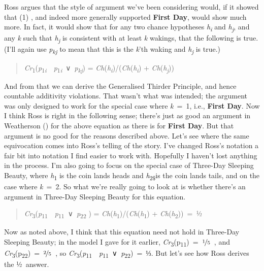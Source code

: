 \documentclass[
  10pt,
  letterpaper,
  DIV=11,
  numbers=noendperiod,
  twoside]{scrartcl}
\begin{document}
Ross argues that the style of argument we've been considering would, if
it showed that (1) , and indeed more generally supported \textbf{First
Day}, would show much more. In fact, it would show that for any two
chance hypotheses \emph{h\textsubscript{i}} and
\emph{h\textsubscript{j}}, and any \emph{k} such that
\emph{h\textsubscript{j}} is consistent with at least \emph{k} wakings,
that the following is true. (I'll again use \emph{p\textsubscript{kj}}
to mean that this is the \emph{k}'th waking and
\emph{h\textsubscript{j}} is true.)

\begin{quote}
\emph{Cr}\textsubscript{1}(\emph{p}\textsubscript{1\emph{i}}~\textbar~\emph{p}\textsubscript{1\emph{i}}~∨~\emph{p\textsubscript{kj}})
=
\emph{Ch}(\emph{h\textsubscript{i}})/(\emph{Ch}(\emph{h\textsubscript{i}})
+ \emph{Ch}(\emph{h\textsubscript{j}}))
\end{quote}

And from that we can derive the Generalised Thirder Principle, and hence
countable additivity violations. That wasn't what was intended; the
argument was only designed to work for the special case where
\emph{k}~=~1, i.e., \textbf{First Day}. Now I think Ross is right in the
following sense; there's just as good an argument in Weatherson
() for the above equation as there
is for \textbf{First Day}. But that argument is no good for the reasons
described above. Let's see where the same equivocation comes into Ross's
telling of the story. I've changed Ross's notation a fair bit into
notation I find easier to work with. Hopefully I haven't lost anything
in the process. I'm also going to focus on the special case of Three-Day
Sleeping Beauty, where \emph{h}\textsubscript{1} is the coin lands heads
and \emph{h}\textsubscript{2\$}is the coin lands tails, and on the case
where \emph{k}~=~2. So what we're really going to look at is whether
there's an argument in Three-Day Sleeping Beauty for this equation.

\begin{quote}
\emph{Cr}\textsubscript{3}(\emph{p}\textsubscript{11}~\textbar~\emph{p}\textsubscript{11}~∨~\emph{p}\textsubscript{22}
) =
\emph{Ch}(\emph{h}\textsubscript{1})/(\emph{Ch}(\emph{h}\textsubscript{1})
+ \emph{Ch}(\emph{h}\textsubscript{2}))~=~½
\end{quote}

Now as noted above, I think that this equation need not hold in
Three-Day Sleeping Beauty; in the model I gave for it earlier,
\emph{Cr}\textsubscript{3}(p\textsubscript{11})~=~\(\nicefrac{1}{5}\)~,
and
\emph{Cr}\textsubscript{3}(p\textsubscript{22})~=~\(\nicefrac{2}{5}\)~,
so
\emph{Cr}\textsubscript{3}(\emph{p}\textsubscript{11}~\textbar~\emph{p}\textsubscript{11}~∨~\emph{p}\textsubscript{22})~=~⅓.
But let's see how Ross derives the ½~answer.
\end{document}
